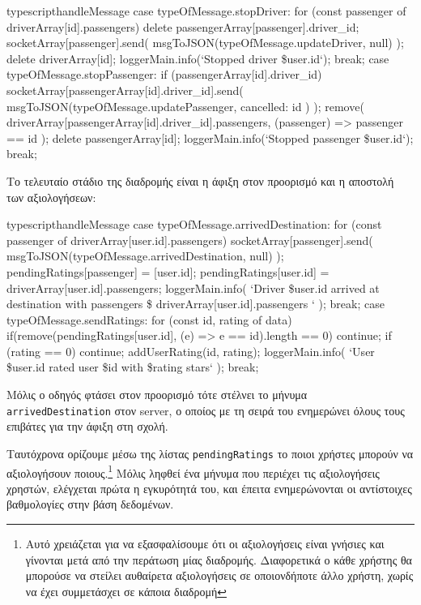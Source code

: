 \documentclass[../thesis.tex]{subfiles}
\begin{document}
\begin{codeblock}{typescript}{handleMessage}
  case typeOfMessage.stopDriver: {
    for (const passenger of driverArray[id].passengers){
      delete passengerArray[passenger].driver_id;
      socketArray[passenger].send(
        msgToJSON(typeOfMessage.updateDriver, null)
      );
    }
    delete driverArray[id];
    loggerMain.info(`Stopped driver \${user.id}`);
    break;
  }
  case typeOfMessage.stopPassenger: {
    if (passengerArray[id].driver_id) {
      socketArray[passengerArray[id].driver_id].send(
        msgToJSON(typeOfMessage.updatePassenger, { cancelled: id })
      );
      remove(
        driverArray[passengerArray[id].driver_id].passengers,
        (passenger) => passenger == id
      );
    }
    delete passengerArray[id];
    loggerMain.info(`Stopped passenger \${user.id}`);
    break;
  }
\end{codeblock}

Το τελευταίο στάδιο της διαδρομής είναι η άφιξη στον προορισμό και η αποστολή των αξιολογήσεων: 

\begin{codeblock}{typescript}{handleMessage}
  case typeOfMessage.arrivedDestination: {
    for (const passenger of driverArray[user.id].passengers) {
      socketArray[passenger].send(
        msgToJSON(typeOfMessage.arrivedDestination, null)
      );
      pendingRatings[passenger] = [user.id];
    }
    pendingRatings[user.id] = driverArray[user.id].passengers;
    loggerMain.info(
      `Driver \${user.id} arrived at destination with passengers \${
        driverArray[user.id].passengers
      }`
    );
    break;
  }
  case typeOfMessage.sendRatings: {
    for (const {id, rating} of data) {
      if(remove(pendingRatings[user.id], (e) => e == id).length == 0) continue;
      if (rating == 0) continue;
      addUserRating(id, rating);
      loggerMain.info(
        `User \${user.id} rated user \${id} with \${rating} stars`
      );
    }
    break;
  }
\end{codeblock}

Μόλις ο οδηγός φτάσει στον προορισμό τότε στέλνει το μήνυμα \texttt{arrived\-Destination} στον server, ο οποίος με τη σειρά του ενημερώνει όλους τους επιβάτες για την άφιξη στη σχολή.

Ταυτόχρονα ορίζουμε μέσω της λίστας \texttt{pendingRatings} το ποιοι χρήστες μπορούν να αξιολογήσουν ποιους.\footnote{Αυτό χρειάζεται για να εξασφαλίσουμε ότι οι αξιολογήσεις είναι γνήσιες και γίνονται μετά από την περάτωση μίας διαδρομής. Διαφορετικά ο κάθε χρήστης θα μπορούσε να στείλει αυθαίρετα αξιολογήσεις σε οποιονδήποτε άλλο χρήστη, χωρίς να έχει συμμετάσχει σε κάποια διαδρομή}
Μόλις ληφθεί ένα μήνυμα που περιέχει τις αξιολογήσεις χρηστών, ελέγχεται πρώτα η εγκυρότητά του, και έπειτα ενημερώνονται οι αντίστοιχες βαθμολογίες στην βάση δεδομένων.
\end{document}
